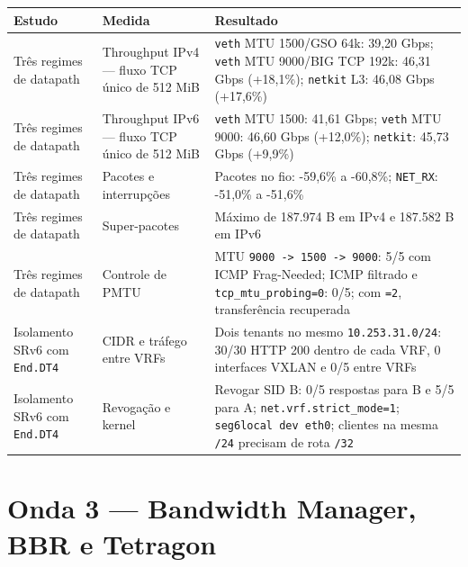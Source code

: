 \documentclass[12pt,openany,oneside,a4paper,chapter=TITLE,english,brazil]{abntex2}
\begin{document}
\begin{quadro}[!htbp]
\caption{Resultados de BIG TCP e SRv6}
\footnotesize
\begin{tabularx}{\textwidth}{|>{\raggedright\arraybackslash\hsize=0.683\hsize}X|>{\raggedright\arraybackslash\hsize=0.924\hsize}X|>{\raggedright\arraybackslash\hsize=1.393\hsize}X|}
\hline
\textbf{Estudo} & \textbf{Medida} & \textbf{Resultado} \\
\hline
Três regimes de datapath & Throughput IPv4 --- fluxo TCP único de 512 MiB & \texttt{veth} MTU 1500/GSO 64k: 39,20 Gbps; \texttt{veth} MTU 9000/BIG
TCP 192k: 46,31 Gbps (+18,1\%); \texttt{netkit} L3: 46,08 Gbps (+17,6\%) \\
\hline
Três regimes de datapath & Throughput IPv6 --- fluxo TCP único de 512 MiB & \texttt{veth} MTU 1500: 41,61 Gbps; \texttt{veth} MTU 9000: 46,60 Gbps
(+12,0\%); \texttt{netkit}: 45,73 Gbps (+9,9\%) \\
\hline
Três regimes de datapath & Pacotes e interrupções & Pacotes no fio: -59,6\% a -60,8\%; \texttt{NET\_\allowbreak{}RX}:
-51,0\% a -51,6\% \\
\hline
Três regimes de datapath & Super-pacotes & Máximo de 187.974 B em IPv4 e 187.582 B em IPv6 \\
\hline
Três regimes de datapath & Controle de PMTU & MTU
\texttt{9000 -{}\allowbreak{}\textgreater{} 1500 -{}\allowbreak{}\textgreater{} 9000}:
5/5 com ICMP Frag-Needed; ICMP filtrado e
\texttt{tcp\_\allowbreak{}mtu\_\allowbreak{}probing=\allowbreak{}0}:
0/5; com \texttt{=\allowbreak{}2}, transferência recuperada \\
\hline
Isolamento SRv6 com \texttt{End.\allowbreak{}DT4} & CIDR e tráfego entre VRFs & Dois tenants no mesmo
\texttt{10.\allowbreak{}253.\allowbreak{}31.\allowbreak{}0/\allowbreak{}24}:
30/30 HTTP 200 dentro de cada VRF, 0 interfaces VXLAN e 0/5 entre VRFs \\
\hline
Isolamento SRv6 com \texttt{End.\allowbreak{}DT4} & Revogação e kernel & Revogar SID B: 0/5 respostas para B e 5/5 para A;
\texttt{net.\allowbreak{}vrf.\allowbreak{}strict\_\allowbreak{}mode=\allowbreak{}1};
\texttt{seg6local dev eth0}; clientes na mesma \texttt{/\allowbreak{}24}
precisam de rota \texttt{/\allowbreak{}32} \\
\hline
\end{tabularx}
\end{quadro}

\section{Onda 3 --- Bandwidth Manager, BBR e Tetragon}\label{onda-3-bandwidth-manager-bbr-e-tetragon}
\end{document}
